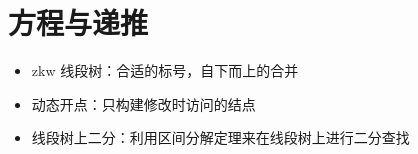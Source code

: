 \chapter{方程与递推}


\begin{summary}
    \begin{itemize}
    \item zkw 线段树：合适的标号，自下而上的合并
    \item 动态开点：只构建修改时访问的结点
    \item 线段树上二分：利用区间分解定理来在线段树上进行二分查找
    \end{itemize}
\end{summary}